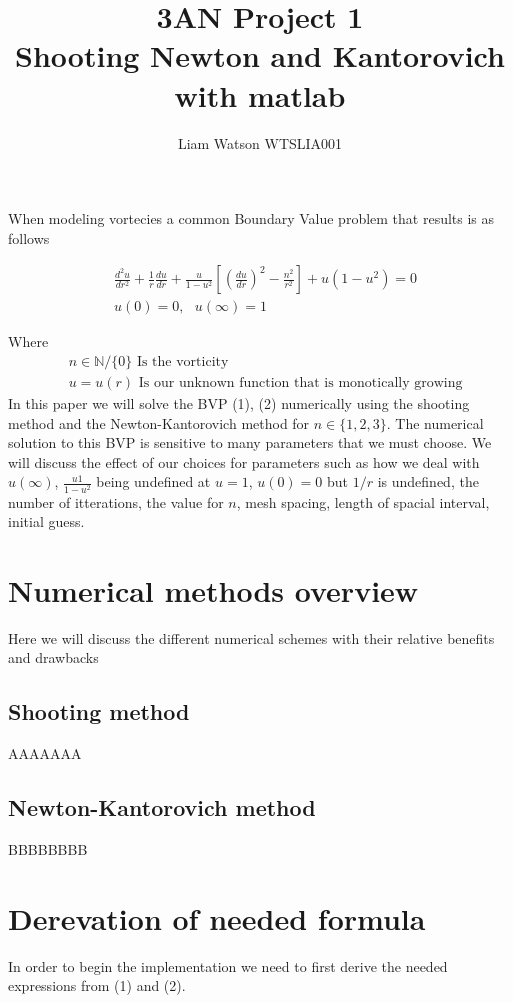 \documentclass{article}
\title{3AN Project 1\\ Shooting Newton and Kantorovich with matlab}
\author{Liam Watson WTSLIA001}
\begin{document}
\maketitle
When modeling vortecies a common Boundary Value problem that results is as follows


\begin{align}
&\frac{d^2 u}{dr^2} + \frac{1}{r}\frac{du}{dr} + \frac{u}{1-u^2}\left[\left(\frac{du}{dr}\right)^2 - \frac{n^2}{r^2}\right] + u(1-u^2) = 0 \\
&u(0) = 0,\ \ \  u(\infty) = 1
\end{align}

Where 
\begin{align*}
&n\in \mathbb{N}/\{0\} \text{ Is the vorticity} \\
&u = u(r)  \text{ Is our unknown function that is monotically growing} 
\end{align*}
In this paper we will solve the BVP (1), (2) numerically using the shooting method and the Newton-Kantorovich method for $n\in \{1,2,3\}$. The numerical solution to this BVP is sensitive to many parameters that we must choose. We will discuss the effect of our choices for parameters such as how we deal with $u(\infty)$, $\frac{u1}{1-u^2}$ being undefined at $u = 1$, $u(0) = 0$ but $1/r$ is undefined, the number of itterations, the value for $n$, mesh spacing, length of spacial interval, initial guess.

\section{Numerical methods overview}
Here we will discuss the different numerical schemes with their relative benefits and drawbacks 
\subsection{Shooting method}
AAAAAAA
\subsection{Newton-Kantorovich method}
BBBBBBBB
\section{Derevation of needed formula}
In order to begin the implementation we need to first derive the needed expressions from (1) and (2).
\end{document}
